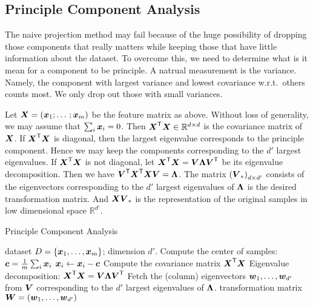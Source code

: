 \subsection{Principle Component Analysis}
The naive projection method may fail because of the huge possibility of dropping those components that really
matters while keeping those that have little information about the dataset. To overcome this, we need to
determine what is it mean for a component to be principle. A natrual measurement is the variance. Namely, 
the component with largest variance and lowest covariance w.r.t.\ others counts most. We only drop out those 
with small variances. 
\par
Let $\boldsymbol{X} = {\left(\boldsymbol{x}_1; \dotsc; \boldsymbol{x}_m\right)}$ be the feature matrix as above. Without loss of 
generality, we may assume that $\sum_i \boldsymbol{x}_i = 0$. Then ${\boldsymbol{X}}^\mathsf{T}\boldsymbol{X} \in \mathbb{R}^{d \times d}$ is the
covariance matrix of $\boldsymbol{X}$. If ${\boldsymbol{X}}^\mathsf{T}\boldsymbol{X}$ is diagonal, then the largest eigenvalue corresponds to the 
principle component. Hence we may keep the components corresponding to the $d'$ largest eigenvalues. If 
${\boldsymbol{X}}^\mathsf{T}\boldsymbol{X}$ is not diagonal, let ${\boldsymbol{X}}^\mathsf{T}\boldsymbol{X} = \boldsymbol{V}\boldsymbol{\Lambda}{\boldsymbol{V}}^\mathsf{T}$ be its eigenvalue 
decomposition. Then we have ${\boldsymbol{V}}^\mathsf{T}{\boldsymbol{X}}^\mathsf{T}\boldsymbol{X}\boldsymbol{V} = \boldsymbol{\Lambda}$. The matrix 
${\left(\boldsymbol{V}_*\right)}_{d \times d'}$ consists of the eigenvectors corresponding to the $d'$ largest 
eigenvalues of $\boldsymbol{\Lambda}$ is the desired transformation matrix. And $\boldsymbol{X}\boldsymbol{V}_*$ is the representation of
the original samples in low dimensional space $\mathbb{R}^{d'}$.

\begin{algorithm}
    \caption{Principle Component Analysis}\label{algorithm:pca}
    \begin{algorithmic}[1]
        \Require dataset $D = \left\{\boldsymbol{x}_1, \dotsc, \boldsymbol{x}_m\right\}$; dimension $d'$.
        \State Compute the center of samples: $\boldsymbol{c} = \frac{1}{m}\sum_i \boldsymbol{x}_i$
        \State $\boldsymbol{x}_i \gets \boldsymbol{x}_i -\boldsymbol{c}$
        \State Compute the covariance matrix ${\boldsymbol{X}}^\mathsf{T}\boldsymbol{X}$
        \State Eigenvalue decomposition: ${\boldsymbol{X}}^\mathsf{T}\boldsymbol{X} = \boldsymbol{V}\boldsymbol{\Lambda}{\boldsymbol{V}}^\mathsf{T}$
        \State Fetch the (column) eigenvectors $\boldsymbol{w}_1, \dotsc, \boldsymbol{w}_{d'}$ from $\boldsymbol{V}$ corresponding to the
        $d'$ largest eigenvalues of $\boldsymbol{\Lambda}$.
        \Ensure transformation matrix $\boldsymbol{W} = \left(\boldsymbol{w}_1, \dotsc, \boldsymbol{w}_{d'}\right)$
    \end{algorithmic}
\end{algorithm}

